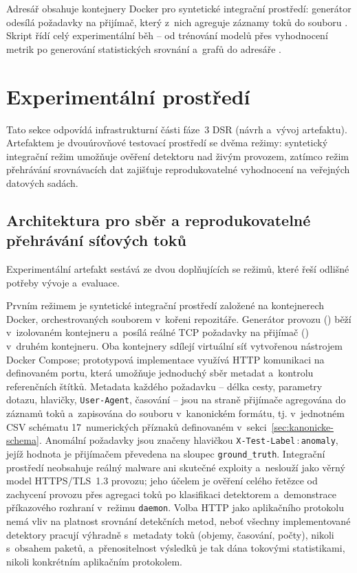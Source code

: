 Adresář  obsahuje kontejnery Docker \parencite{Docker2024} pro syntetické integrační prostředí: generátor odesílá požadavky na přijímač, který z~nich agreguje záznamy toků do souboru . Skript  řídí celý experimentální běh -- od trénování modelů přes vyhodnocení metrik po generování statistických srovnání a~grafů do adresáře .

\section{Experimentální prostředí}
\label{sec:exp-prostredi}

Tato sekce odpovídá infrastrukturní části fáze~3 DSR (návrh a~vývoj artefaktu). Artefaktem je dvouúrovňové testovací prostředí se dvěma režimy: syntetický integrační režim umožňuje ověření detektoru nad živým provozem, zatímco režim přehrávání srovnávacích dat zajišťuje reprodukovatelné vyhodnocení na veřejných datových sadách.

\subsection{Architektura pro sběr a reprodukovatelné přehrávání síťových toků}
\label{sec:architektura-sber}

Experimentální artefakt sestává ze dvou doplňujících se režimů, které řeší odlišné potřeby vývoje a~evaluace.

Prvním režimem je syntetické integrační prostředí založené na kontejnerech Docker, orchestrovaných souborem  v~kořeni repozitáře.
Generátor provozu () běží v~izolovaném kontejneru a~posílá reálné TCP požadavky na přijímač () v~druhém kontejneru.
Oba kontejnery sdílejí virtuální síť vytvořenou nástrojem Docker Compose; prototypová implementace využívá HTTP komunikaci na definovaném portu, která umožňuje jednoduchý sběr metadat a~kontrolu referenčních štítků.
Metadata každého požadavku -- délka cesty, parametry dotazu, hlavičky, \texttt{User-Agent}, časování -- jsou na straně přijímače agregována do záznamů toků a~zapisována do souboru  v~kanonickém formátu, tj. v~jednotném CSV schématu 17~numerických příznaků definovaném v~sekci~\ref{sec:kanonicke-schema}.
Anomální požadavky jsou značeny hlavičkou \texttt{X-Test-Label}\,:\,\texttt{anomaly}, jejíž hodnota je přijímačem převedena na sloupec \texttt{ground\_truth}.
Integrační prostředí neobsahuje reálný malware ani skutečné exploity a~neslouží jako věrný model HTTPS/TLS~1.3 provozu; jeho účelem je ověření celého řetězce od zachycení provozu přes agregaci toků po klasifikaci detektorem a~demonstrace příkazového rozhraní v~režimu \texttt{daemon}. Volba HTTP jako aplikačního protokolu nemá vliv na platnost srovnání detekčních metod, neboť všechny implementované detektory pracují výhradně s~metadaty toků (objemy, časování, počty), nikoli s~obsahem paketů, a~přenositelnost výsledků je tak dána tokovými statistikami, nikoli konkrétním aplikačním protokolem.

